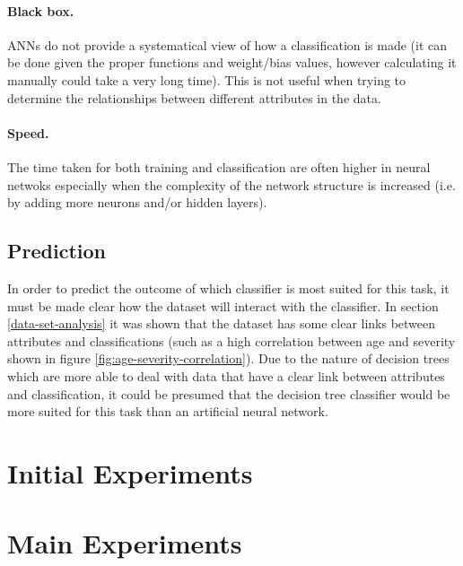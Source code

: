 \documentclass[12pt]{article}
\begin{document}
      \paragraph{Black box.}
        ANNs do not provide a systematical view of how a classification is made (it can be done given the proper functions and weight/bias values, however calculating it manually could take a very long time). This is not useful when trying to determine the relationships between different attributes in the data.

      \paragraph{Speed.}
        The time taken for both training and classification are often higher in neural netwoks especially when the complexity of the network structure is increased (i.e. by adding more neurons and/or hidden layers).

  \subsection{Prediction}
    In order to predict the outcome of which classifier is most suited for this task, it must be made clear how the dataset will interact with the classifier.
    In section \ref{data-set-analysis} it was shown that the dataset has some clear links between attributes and classifications (such as a high correlation between age and severity shown in figure \ref{fig:age-severity-correlation}). Due to the nature of decision trees which are more able to deal with data that have a clear link between attributes and classification, it could be presumed that the decision tree classifier would be more suited for this task than an artificial neural network.

\section{Initial Experiments}



\section{Main Experiments}
\end{document}
